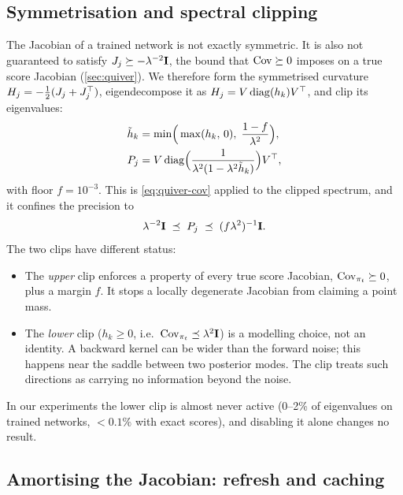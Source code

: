 \subsection{Symmetrisation and spectral clipping}\label{sec:impl-clip}

The Jacobian of a trained network is not exactly symmetric.
It is also not guaranteed to satisfy $J_j\succeq-\lambda^{-2}\mathbf{I}$, the bound that $\operatorname{Cov}\succeq0$ imposes on a true score Jacobian (\cref{sec:quiver}).
We therefore form the symmetrised curvature $H_j=-\tfrac12(J_j+J_j^\top)$, eigendecompose it as $H_j=V\operatorname{diag}(h_k)V^\top$, and clip its eigenvalues:
\begin{equation}\label{eq:curvature-clip}
\begin{aligned}
  \tilde h_k&=\min\!\Big(\max(h_k,\,0),\;\frac{1-f}{\lambda^2}\Big),\\
  P_j&=V\operatorname{diag}\!\Big(\frac{1}{\lambda^2(1-\lambda^2\tilde h_k)}\Big)V^\top,
\end{aligned}
\end{equation}
with floor $f=10^{-3}$.
This is \cref{eq:quiver-cov} applied to the clipped spectrum, and it confines the precision to
\[
  \lambda^{-2}\mathbf{I}\;\preceq\;P_j\;\preceq\;(f\lambda^2)^{-1}\mathbf{I} .
\]
The two clips have different status:
\begin{itemize}
  \item The \emph{upper} clip enforces a property of every true score Jacobian, $\operatorname{Cov}_{\pi_t}\succeq0$, plus a margin $f$. It stops a locally degenerate Jacobian from claiming a point mass.
  \item The \emph{lower} clip ($h_k\ge0$, i.e.\ $\operatorname{Cov}_{\pi_t}\preceq\lambda^2\mathbf{I}$) is a modelling choice, not an identity. A backward kernel can be wider than the forward noise; this happens near the saddle between two posterior modes. The clip treats such directions as carrying no information beyond the noise.
\end{itemize}
In our experiments the lower clip is almost never active (0--2\% of eigenvalues on trained networks, $<0.1\%$ with exact scores), and disabling it alone changes no result.

\subsection{Amortising the Jacobian: refresh and caching}\label{sec:impl-refresh}

